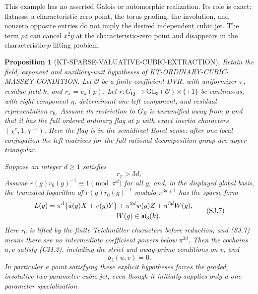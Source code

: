 \documentclass[11pt,a4paper]{article}
\newtheorem{proposition}[theorem]{Proposition}
\theoremstyle{definition}
\begin{document}
This example has no asserted Galois or automorphic realization.
Its role is exact: flatness, a characteristic-zero point,
the torus grading, the involution, and nonzero opposite
entries do not imply the desired independent cubic jet.
The term $pz$ can cancel $x^2y$ at the characteristic-zero
point and disappears in the characteristic-$p$ lifting problem.

\begin{proposition}[KT-SPARSE-VALUATIVE-CUBIC-EXTRACTION]
Retain the field, exponent and auxiliary-unit hypotheses
of KT-ORDINARY-CUBIC-MASSEY-CONDITION.
Let $\mathcal O$ be a finite coefficient DVR, with
uniformizer $\pi$, residue field $k$, and
$r_\pi=v_\pi(p)$.
Let $r:G_{\mathbf Q}\to
\mathrm{GL}_3(\mathcal O)\rtimes\{\pm1\}$ be continuous,
with right component $\eta$, determinant-one left component,
and residual representation $r_0$.
Assume its restriction to $G_E$ is unramified away from
$p$ and that it has the full ordered ordinary flag at $p$
with exact inertia characters $(\chi^e,1,\chi^{-e})$.
Here the flag is in the semidirect Borel sense: after
one local conjugation the left matrices for the full
rational decomposition group are upper triangular.

Suppose an integer $d\ge1$ satisfies
\[
                              r_\pi>3d,                       \tag{SJ.6}
\]
Assume $r(g)r_0(g)^{-1}\equiv1\pmod{\pi^d}$ for all $g$,
and, in the displayed global basis, the truncated logarithm of
$r(g)r_0(g)^{-1}$ modulo $\pi^{3d+1}$ has the sparse form
\[
\begin{split}
 L(g)={}&\pi^d\{u(g)X+v(g)Y\}
             +\pi^{2d}w(g)Z+\pi^{3d}W(g),\\
 &\hspace{30mm}W(g)\in\mathfrak{sl}_3(k).
\end{split}                                                   \tag{SJ.7}
\]
Here $r_0$ is lifted by the finite Teichm\"uller characters
before reduction, and (SJ.7) means there are no intermediate
coefficient powers below $\pi^{3d}$.
Then the cochains $u,v$ satisfy (CM.2), including the strict
and away-prime conditions on $v$, and
\[
                             \mathfrak o_3(u,v)=0.             \tag{SJ.8}
\]
In particular a point satisfying these explicit hypotheses
forces the graded, involutive two-parameter cubic jet, even
though it initially supplies only a one-parameter specialization.
\end{proposition}
\end{document}
